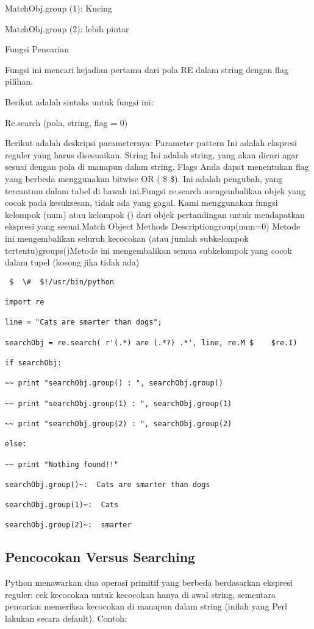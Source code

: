 \begin {enumerate}
\begin {enumerate}
MatchObj.group (1): Kucing

MatchObj.group (2): lebih pintar

Fungsi Pencarian

Fungsi ini mencari kejadian pertama dari pola RE dalam string dengan flag pilihan.

Berikut adalah sintaks untuk fungsi ini:

Re.search (pola, string, flag = 0)

Berikut adalah deskripsi parameternya:
Parameter pattern Ini adalah ekspresi reguler yang harus disesuaikan. String Ini adalah string, yang akan dicari agar sesuai dengan pola di manapun dalam string. Flags Anda dapat menentukan flag yang berbeda menggunakan bitwise OR ( \$    \$). Ini adalah pengubah, yang tercantum dalam tabel di bawah ini.Fungsi re.search mengembalikan objek yang cocok pada kesuksesan, tidak ada yang gagal. Kami menggunakan fungsi kelompok (num) atau kelompok () dari objek pertandingan untuk mendapatkan ekspresi yang sesuai.Match Object Methods Descriptiongroup(num=0) Metode ini mengembalikan seluruh kecocokan (atau jumlah subkelompok tertentu)groups()Metode ini mengembalikan semua subkelompok yang cocok dalam tupel (kosong jika tidak ada)

\begin{verbatim}
 $  \#  $!/usr/bin/python

import re

line = "Cats are smarter than dogs";

searchObj = re.search( r'(.*) are (.*?) .*', line, re.M $    $re.I)

if searchObj:

~~ print "searchObj.group() : ", searchObj.group()

~~ print "searchObj.group(1) : ", searchObj.group(1)

~~ print "searchObj.group(2) : ", searchObj.group(2)

else:

~~ print "Nothing found!!"

searchObj.group()~:  Cats are smarter than dogs

searchObj.group(1)~:  Cats

searchObj.group(2)~:  smarter
\end{verbatim}

\subsection{Pencocokan Versus Searching}
Python menawarkan dua operasi primitif yang berbeda berdasarkan ekspresi reguler: cek kecocokan untuk kecocokan hanya di awal string, sementara pencarian memeriksa kecocokan di manapun dalam string (inilah yang Perl lakukan secara default).
Contoh:


\end{enumerate}
\end{enumerate}
